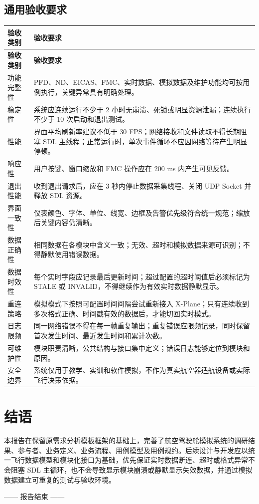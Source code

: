 \documentclass[UTF8,zihao=-4,fontset=none]{ctexart}
\newcommand{\thead}[1]{\cellcolor{Navy}\color{white}\sffamily\bfseries #1}
\begin{document}
\subsection{通用验收要求}
\begin{longtable}{C{3.0cm}L{11.5cm}}
\hline
\thead{验收类别}&\thead{验收要求}\\
\hline
\endfirsthead
\thead{验收类别}&\thead{验收要求}\\
\hline
\endhead
功能完整性&PFD、ND、EICAS、FMC、实时数据、模拟数据及维护功能均可按用例执行，关键异常具有明确处理。\\
\hline
稳定性&系统应连续运行不少于 2 小时无崩溃、死锁或明显资源泄漏；连续执行不少于 10 次启动和退出测试。\\
\hline
性能&界面平均刷新率建议不低于 30 FPS；网络接收和文件读取不得长期阻塞 SDL 主线程；正常运行时，单次事件循环不应因网络等待产生明显停顿。\\
\hline
响应性&用户按键、窗口缩放和 FMC 操作应在 200 ms 内产生可见反馈。\\
\hline
退出性能&收到退出请求后，应在 3 秒内停止数据采集线程、关闭 UDP Socket 并释放 SDL 资源。\\
\hline
界面一致性&仪表颜色、字体、单位、线宽、边框及告警优先级符合统一规范；缩放后关键内容仍清晰。\\
\hline
数据正确性&相同数据在各模块中含义一致；无效、超时和模拟数据来源可识别；不得静默使用错误数据。\\
\hline
数据时效性&每个实时字段应记录最后更新时间；超过配置的超时阈值后必须标记为 STALE 或 INVALID，不得继续作为有效实时数据静默显示。\\
\hline
重连策略&模拟模式下按照可配置时间间隔尝试重新接入 X-Plane；只有连续收到多次格式正确、时间戳有效的数据后，才能切回实时模式。\\
\hline
日志限频&同一网络错误不得在每一帧重复输出；重复错误应限频记录，同时保留首次发生时间、最近发生时间和累计次数。\\
可维护性&模块职责清晰，公共结构与接口集中定义；错误日志能够定位到模块和原因。\\
\hline
安全边界&系统仅用于教学、实训和软件模拟，不作为真实航空器适航设备或实际飞行决策依据。\\
\hline
\end{longtable}

\clearpage
\section*{结语}
本报告在保留原需求分析模板框架的基础上，完善了航空驾驶舱模拟系统的调研结果、参与者、业务定义、业务流程、用例模型及用例规约。后续设计与开发应以统一飞行数据模型和模块化接口为基础，优先保证实时数据断连、超时或格式异常不会阻塞 SDL 主循环，也不会导致显示模块崩溃或静默显示失效数据，并通过模拟数据建立可重复的测试与验收环境。

\vfill
\begin{center}
\small\color{gray}—— 报告结束 ——
\end{center}
\end{document}
